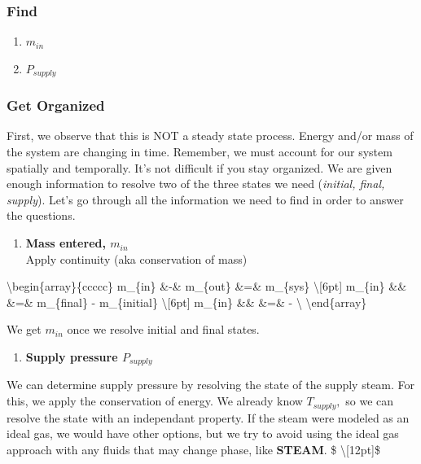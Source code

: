 \documentclass[11pt]{article}
\providecommand{\tightlist}{%
      \setlength{\itemsep}{0pt}\setlength{\parskip}{0pt}}
\begin{document}
    \hypertarget{find}{%
\subsubsection{Find}\label{find}}

\begin{enumerate}
\def\labelenumi{\arabic{enumi}.}
\tightlist
\item
  \(m_{in}\)\\
\item
  \(P_{supply}\)
\end{enumerate}

    \hypertarget{get-organized}{%
\subsubsection{Get Organized}\label{get-organized}}

    First, we observe that this is NOT a steady state process. Energy and/or
mass of the system are changing in time. Remember, we must account for
our system spatially and temporally. It's not difficult if you stay
organized. We are given enough information to resolve two of the three
states we need (\emph{initial, final, supply}). Let's go through all the
information we need to find in order to answer the questions.\\

\begin{enumerate}
\def\labelenumi{\arabic{enumi}.}
\tightlist
\item
  \textbf{Mass entered, \(m_{in}\)}\\
  Apply continuity (aka conservation of mass)
\end{enumerate}

\textbackslash{}begin\{array\}\{ccccc\} m\_\{in\} \&-\& m\_\{out\} \&=\&
\Delta m\_\{sys\} \textbackslash{}{[}6pt{]} m\_\{in\} \&\& \&=\&
m\_\{final\} - m\_\{initial\} \textbackslash{}{[}6pt{]} m\_\{in\} \&\&
\&=\& \displaystyle {} - 
\textbackslash{} \textbackslash{}end\{array\}

We get \(m_{in}\) once we resolve initial and final states.

    \begin{enumerate}
\def\labelenumi{\arabic{enumi}.}
\setcounter{enumi}{1}
\tightlist
\item
  \textbf{Supply pressure \(P_{supply}\)}
\end{enumerate}

We can determine supply pressure by resolving the state of the supply
steam. For this, we apply the conservation of energy. We already know
\(T_{supply},\) so we can resolve the state with an independant
property. If the steam were modeled as an ideal gas, we would have other
options, but we try to avoid using the ideal gas approach with any
fluids that may change phase, like \textbf{STEAM}. \$
\textbackslash{}{[}12pt{]}\$
\end{document}
